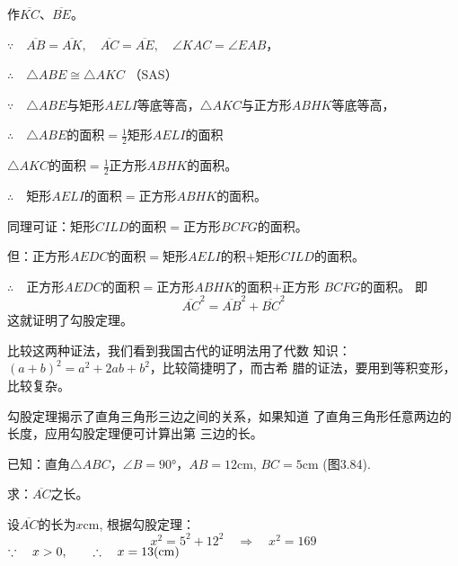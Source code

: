 作$\overline{KC}$、$\overline{BE}$。

$\because\quad \overline{AB}=\overline{AK},\quad \overline{AC}=\overline{AE},\quad \angle KAC=\angle EAB$，

$\therefore\quad \triangle ABE\cong \triangle AKC$ （SAS）

$\because\quad \triangle ABE$与矩形$AELI$等底等高，$\triangle AKC$与正方形$ABHK$等底等高，

$\therefore\quad \triangle ABE$的面积$=\frac{1}{2}$矩形$AELI$的面积

$\triangle AKC$的面积$=\frac{1}{2}$正方形$ABHK$的面积。

$\therefore\quad $矩形$AELI$的面积$=$正方形$ABHK$的面积。

同理可证：矩形$CILD$的面积$=$正方形$BCFG$的面积。

但：正方形$AEDC$的面积$=$矩形$AELI$的积$+$矩形$CILD$的面积。

$\therefore\quad $正方形$AEDC$的面积$=$正方形$ABHK$的面积$+$正方形
$BCFG$的面积。
即
\[\overline{AC}^2=\overline{AB}^2+\overline{BC}^2\]
这就证明了勾股定理。

比较这两种证法，我们看到我国古代的证明法用了代数
知识：$(a+b)^2=a^2+2ab+b^2$，比较简捷明了，而古希
腊的证法，要用到等积变形，比较复杂。

勾股定理揭示了直角三角形三边之间的关系，如果知道
了直角三角形任意两边的长度，应用勾股定理便可计算出第
三边的长。

\begin{example}
    已知：直角$\triangle ABC$，$\angle B=\ang{90}$，$AB=12$cm,
$BC=5$cm (图3.84).

求：$\overline{AC}$之长。
\end{example}


\begin{solution}
    设$\overline{AC}$的长为$x$cm, 根据勾股定理：
\[x^2=5^2+12^2\quad \Rightarrow\quad x^2=169\]
$\because\quad x>0,\qquad \therefore\quad x=13({\rm cm})$
\end{solution}

\begin{figure}
    \begin{minipage}[t]{0.48\linewidth}
    \centering
\begin{tikzpicture}[>=latex, scale=.6]
    \end{tikzpicture}
    \caption{}
    \end{minipage}
    \begin{minipage}[t]{0.48\linewidth}
    \centering
    \begin{tikzpicture}[>=latex, scale=.6]
    \end{tikzpicture}
    \caption{}
    \end{minipage}
    \end{figure}

